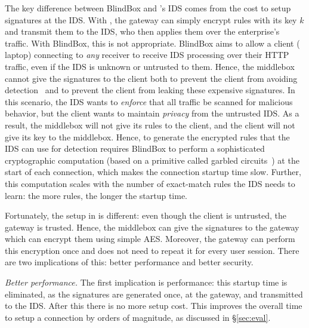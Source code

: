 The key difference between BlindBox and \sys's IDS comes from the cost to setup signatures at the IDS. 
With \sys, the gateway can simply encrypt rules with its key $k$ and transmit them to the IDS, who then applies them over the enterprise's traffic.
With BlindBox, this is not appropriate.
BlindBox aims to allow a client (\eg{} laptop) connecting to {\em any} receiver to receive IDS processing over their HTTP traffic, even if the IDS is unknown or untrusted to them.
Hence, the middlebox cannot give the signatures to the client both to prevent the client from avoiding detection~\cite{Bro} and to prevent the client from leaking these expensive signatures. 
In this scenario, the IDS wants to {\it enforce} that all traffic be scanned for malicious behavior, but the client wants to maintain {\it privacy} from the untrusted IDS.
As a result, the middlebox will not give its rules to the client, and the client will not give its key to the middlebox.
Hence,  to generate the encrypted rules that the IDS can use for detection requires BlindBox to perform
a sophisticated cryptographic computation (based on a primitive called garbled circuits~\cite{Yao82}) at the start of each connection, which makes the connection
startup time slow. 
Further, this computation scales with the number of exact-match rules the IDS needs to learn: the more rules, the longer the startup time.

Fortunately, the setup in \sys is different: even though the client is untrusted, the gateway is trusted. Hence, the middlebox can give the signatures to the gateway which can encrypt them using simple AES. Moreover, the gateway can perform this encryption once and does not need to repeat it for every user session. 
There are two implications of this: better performance and better security.

\textit{Better performance.}
The first implication is performance: this startup time is eliminated, as the signatures are generated once, at the gateway, and transmitted to the IDS. After this there is no more setup cost. This improves the overall time to setup a connection by orders of magnitude, as discussed in \S\ref{sec:eval}. 

